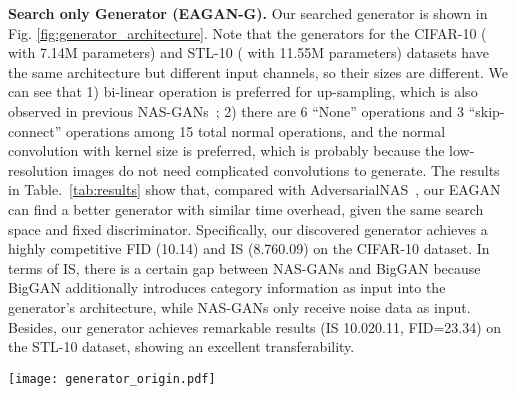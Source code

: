 \documentclass[runningheads]{llncs}
\begin{document}
\textbf{Search only Generator (EAGAN-G).} Our searched generator  is shown in Fig. \ref{fig:generator_architecture}. Note that the generators for the CIFAR-10 ( with 7.14M parameters) and STL-10 ( with 11.55M parameters) datasets have the same architecture but different input channels, so their sizes are different. We can see that 1) bi-linear operation is preferred for up-sampling, which is also observed in previous NAS-GANs~\cite{Adversarialnas,offgan}; 2) there are 6 ``None'' operations and 3 ``skip-connect'' operations among 15 total normal operations, and the normal convolution with kernel size  is preferred, which is probably because the low-resolution images do not need complicated convolutions to generate. The results in Table.~\ref{tab:results} show that, compared with AdversarialNAS~\cite{Adversarialnas}, our EAGAN can find a better generator with similar time overhead, given the same search space and fixed discriminator. Specifically, our discovered generator achieves a highly competitive FID (10.14) and IS (8.760.09) on the CIFAR-10 dataset. In terms of IS, there is a certain gap between NAS-GANs and BigGAN \cite{biggan} because BigGAN additionally introduces category information as input into the generator's architecture, while NAS-GANs only receive noise data as input. Besides, our generator  achieves remarkable results (IS 10.020.11, FID=23.34) on the STL-10 dataset, showing an excellent transferability.








\begin{figure*}
    \centering
\texttt{[image: generator\_origin.pdf]}
\caption{The architecture of the searched generator ().}
    \label{fig:generator_architecture}
\end{figure*}
\end{document}
